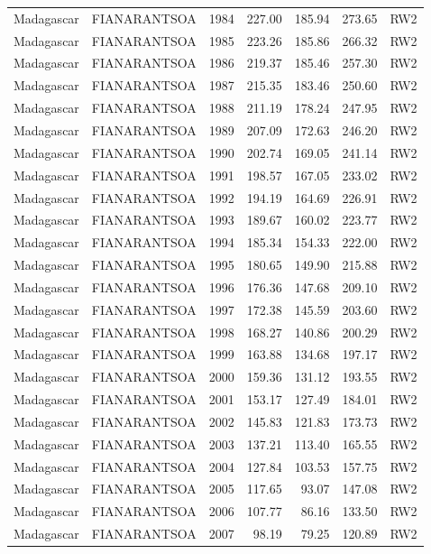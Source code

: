 \begin{longtable}{lllrrrl}
  Madagascar & FIANARANTSOA & 1984 & 227.00 & 185.94 & 273.65 & RW2 \\ 
  Madagascar & FIANARANTSOA & 1985 & 223.26 & 185.86 & 266.32 & RW2 \\ 
  Madagascar & FIANARANTSOA & 1986 & 219.37 & 185.46 & 257.30 & RW2 \\ 
  Madagascar & FIANARANTSOA & 1987 & 215.35 & 183.46 & 250.60 & RW2 \\ 
  Madagascar & FIANARANTSOA & 1988 & 211.19 & 178.24 & 247.95 & RW2 \\ 
  Madagascar & FIANARANTSOA & 1989 & 207.09 & 172.63 & 246.20 & RW2 \\ 
  Madagascar & FIANARANTSOA & 1990 & 202.74 & 169.05 & 241.14 & RW2 \\ 
  Madagascar & FIANARANTSOA & 1991 & 198.57 & 167.05 & 233.02 & RW2 \\ 
  Madagascar & FIANARANTSOA & 1992 & 194.19 & 164.69 & 226.91 & RW2 \\ 
  Madagascar & FIANARANTSOA & 1993 & 189.67 & 160.02 & 223.77 & RW2 \\ 
  Madagascar & FIANARANTSOA & 1994 & 185.34 & 154.33 & 222.00 & RW2 \\ 
  Madagascar & FIANARANTSOA & 1995 & 180.65 & 149.90 & 215.88 & RW2 \\ 
  Madagascar & FIANARANTSOA & 1996 & 176.36 & 147.68 & 209.10 & RW2 \\ 
  Madagascar & FIANARANTSOA & 1997 & 172.38 & 145.59 & 203.60 & RW2 \\ 
  Madagascar & FIANARANTSOA & 1998 & 168.27 & 140.86 & 200.29 & RW2 \\ 
  Madagascar & FIANARANTSOA & 1999 & 163.88 & 134.68 & 197.17 & RW2 \\ 
  Madagascar & FIANARANTSOA & 2000 & 159.36 & 131.12 & 193.55 & RW2 \\ 
  Madagascar & FIANARANTSOA & 2001 & 153.17 & 127.49 & 184.01 & RW2 \\ 
  Madagascar & FIANARANTSOA & 2002 & 145.83 & 121.83 & 173.73 & RW2 \\ 
  Madagascar & FIANARANTSOA & 2003 & 137.21 & 113.40 & 165.55 & RW2 \\ 
  Madagascar & FIANARANTSOA & 2004 & 127.84 & 103.53 & 157.75 & RW2 \\ 
  Madagascar & FIANARANTSOA & 2005 & 117.65 & 93.07 & 147.08 & RW2 \\ 
  Madagascar & FIANARANTSOA & 2006 & 107.77 & 86.16 & 133.50 & RW2 \\ 
  Madagascar & FIANARANTSOA & 2007 & 98.19 & 79.25 & 120.89 & RW2 \\ 

\end{longtable}
